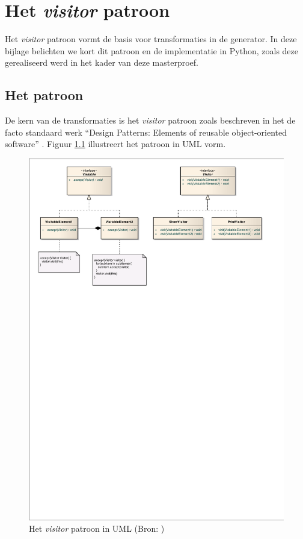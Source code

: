 
\chapter{Het \emph{visitor} patroon}
\label{appendix:visitor}

Het \emph{visitor} patroon vormt de basis voor transformaties in de generator.
In deze bijlage belichten we kort dit patroon en de implementatie in Python,
zoals deze gerealiseerd werd in het kader van deze masterproef.

\section{Het patroon}
\label{section:devel-visitor-pattern}

De kern van de transformaties is het \emph{visitor} patroon zoals beschreven in
het de facto standaard werk ``Design Patterns: Elements of reusable
object-oriented software'' \citep{gamma1994design}. Figuur \ref{fig:visitor}
illustreert het patroon in UML vorm.

\begin{figure}[ht]
  \centering
  \includegraphics[width=0.9\linewidth]{resources/visitor.pdf}
  \caption[Het \emph{visitor} patroon in UML]{Het \emph{visitor} patroon in UML (Bron: \citep{wikipedia:visitor})}
  \label{fig:visitor}
\end{figure}

